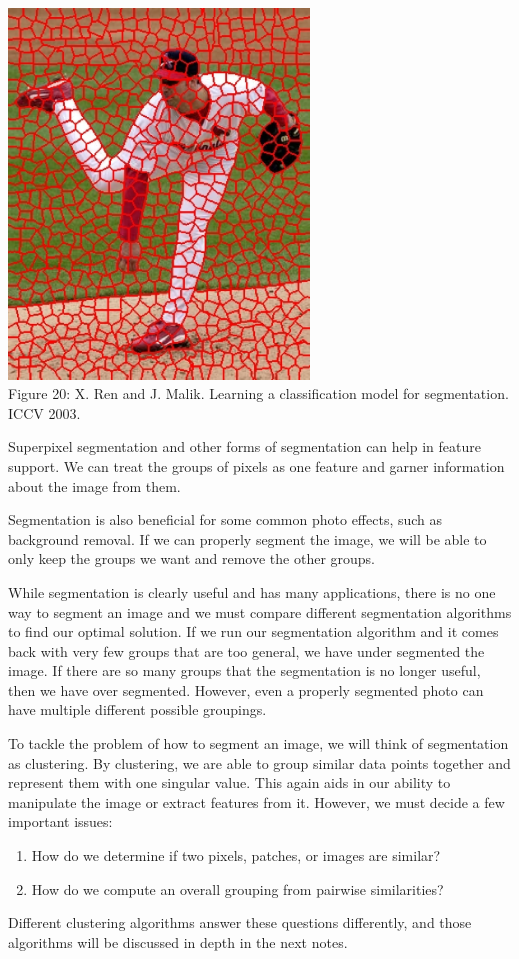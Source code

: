 \documentclass{article}
\begin{document}
\begin{center}
\includegraphics[width=8cm]{superpixels.png} \\
Figure 20: X. Ren and J. Malik. Learning a classification model for segmentation. ICCV 2003.
\end{center}

Superpixel segmentation and other forms of segmentation can help in feature support. We can treat the groups of pixels as one feature and garner information about the image from them.

Segmentation is also beneficial for some common photo effects, such as background removal. If we can properly segment the image, we will be able to only keep the groups we want and remove the other groups.

While segmentation is clearly useful and has many applications, there is no one way to segment an image and we must compare different segmentation algorithms to find our optimal solution. If we run our segmentation algorithm and it comes back with very few groups that are too general, we have under segmented the image. If there are so many groups that the segmentation is no longer useful, then we have over segmented. However, even a properly segmented photo can have multiple different possible groupings.

To tackle the problem of how to segment an image, we will think of segmentation as clustering. By clustering, we are able to group similar data points together and represent them with one singular value. This again aids in our ability to manipulate the image or extract features from it. However, we must decide a few important issues:
\begin{enumerate}
\item How do we determine if two pixels, patches, or images are similar?
\item How do we compute an overall grouping from	
pairwise similarities?
\end{enumerate}
Different clustering algorithms answer these questions differently, and those algorithms will be discussed in depth in the next notes.
\end{document}
